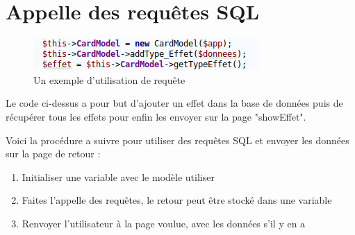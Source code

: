 \documentclass[a4paper,11pt]{report}
\begin{document}
	\section{Appelle des requêtes SQL}
	 \begin{figure}[th]
     		 \begin{center}
        	\includegraphics[scale=0.4]{Assets/requete.png}
       		 \caption{Un exemple d'utilisation de requête}
       		 \label{fig9}
     		 \end{center}
   	 \end{figure}
	
	Le code ci-dessus a pour but d'ajouter un effet dans la base de données puis de récupérer tous les effets pour enfin les envoyer sur la page "showEffet".

	Voici la procédure a suivre pour utiliser des requêtes SQL et envoyer les données sur la page de retour :
	\begin{enumerate}
		\item Initialiser une variable avec le modèle utiliser
		\item Faites l'appelle des requêtes, le retour peut être stocké dans une variable
		\item Renvoyer l'utilisateur à la page voulue, avec les données s'il y en a
	\end{enumerate}
	

        
\end{document}
